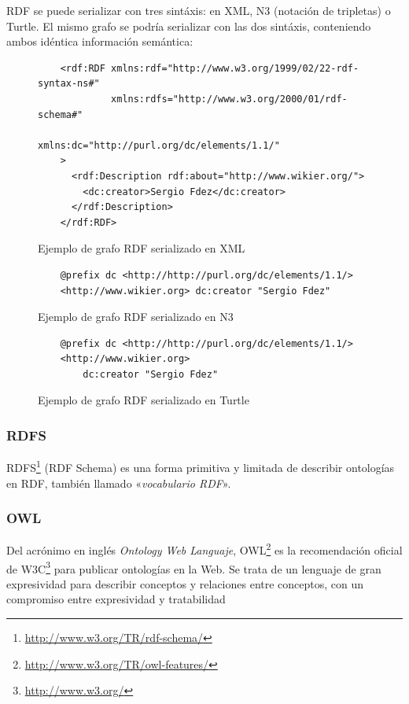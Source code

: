 RDF se puede serializar con tres sintáxis: en XML, N3 (notación de tripletas)
o Turtle. El mismo grafo se podría serializar con las dos sintáxis, conteniendo ambos 
idéntica información semántica:

\begin{figure}
\begin{verbatim}
	<rdf:RDF xmlns:rdf="http://www.w3.org/1999/02/22-rdf-syntax-ns#"
	         xmlns:rdfs="http://www.w3.org/2000/01/rdf-schema#"
                 xmlns:dc="http://purl.org/dc/elements/1.1/"
	>
	  <rdf:Description rdf:about="http://www.wikier.org/">
	    <dc:creator>Sergio Fdez</dc:creator>	
	  </rdf:Description>
	</rdf:RDF>
\end{verbatim}
	\caption{Ejemplo de grafo RDF serializado en XML}
	\label{fig:ejemplo.rdfxml}
\end{figure}

\begin{figure}
\begin{verbatim}
	@prefix dc <http://http://purl.org/dc/elements/1.1/>
	<http://www.wikier.org> dc:creator "Sergio Fdez"
\end{verbatim}
	\caption{Ejemplo de grafo RDF serializado en N3}
	\label{fig:ejemplo.rdfn3}
\end{figure}

\begin{figure}
\begin{verbatim}
	@prefix dc <http://http://purl.org/dc/elements/1.1/>
	<http://www.wikier.org> 
		dc:creator "Sergio Fdez"
\end{verbatim}
	\caption{Ejemplo de grafo RDF serializado en Turtle}
	\label{fig:ejemplo.rdfturtle}
\end{figure}

\subsubsection{RDFS}

RDFS\footnote{\url{http://www.w3.org/TR/rdf-schema/}} (RDF Schema) es una
forma primitiva y limitada de describir ontologías en RDF, también llamado
«\emph{vocabulario RDF}».

\subsubsection{OWL}

Del acrónimo en inglés \emph{Ontology Web Languaje}, 
OWL\footnote{\url{http://www.w3.org/TR/owl-features/}} es la recomendación 
oficial de W3C\footnote{\url{http://www.w3.org/}} para publicar ontologías en 
la Web. Se trata de un lenguaje de gran expresividad para describir conceptos 
y relaciones entre conceptos, con un compromiso entre expresividad y tratabilidad


